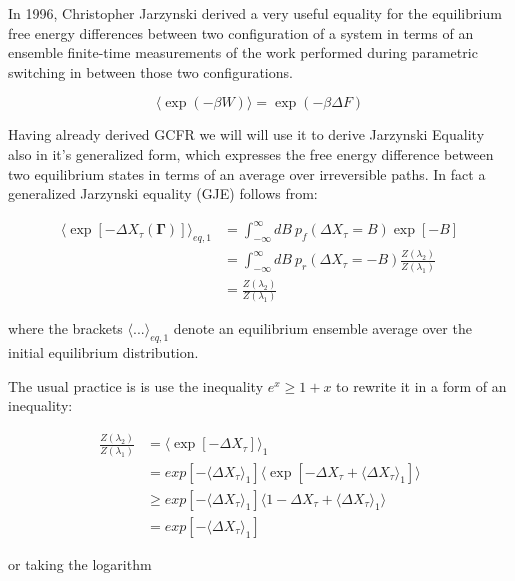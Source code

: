 \documentclass[a4paper,12pt]{article}
\begin{document}
In 1996, Christopher Jarzynski\cite{Jarzynski:1997uj} derived a very useful equality for the equilibrium free energy differences between two configuration of a system in terms of an ensemble finite-time measurements of the work performed during parametric switching in between those two configurations.

\begin{equation}
\label{JarzynskiInequality}
  \langle \exp(-\beta W) \rangle = \exp(-\beta  \Delta F)
\end{equation}


Having already derived GCFR we will will use it to derive Jarzynski Equality also in it's generalized form, which expresses the free energy difference between two equilibrium states in terms of an average over irreversible paths.
In fact a generalized Jarzynski equality (GJE) follows from:

\begin{equation}
\begin{aligned}
  \langle \exp[-\Delta X_{\tau}(\bm{\Gamma})] \rangle_{eq,1} 
  &= \int_{-\infty}^{\infty} dB\ p_f(\Delta X_\tau =B)\exp[-B]\\
 &= \int_{-\infty}^{\infty} dB\ p_r(\Delta X_\tau =-B)\frac{Z(\lambda_2)}{Z(\lambda_1)}\\
 &=\frac{Z(\lambda_2)}{Z(\lambda_1)}
\end{aligned}
\end{equation}

where the brackets $\langle ... \rangle_{eq,1}$ denote an equilibrium ensemble average over the initial equilibrium distribution.

The usual practice is is use the inequality $e^x \geq 1+x $ to rewrite it in a form of an inequality:

\begin{equation}
\begin{aligned}
  \frac{Z(\lambda_2)}{Z(\lambda_1)} &=\langle \exp[-\Delta X_\tau ]\rangle_1 \\
  &=exp[-\langle\Delta X_\tau \rangle_1]\langle \exp[-\Delta X_\tau + \langle \Delta X_\tau \rangle_1]\rangle \\
  &\geq exp[-\langle\Delta X_\tau \rangle_1]\langle 1- \Delta X_\tau + \langle \Delta X_\tau \rangle_1 \rangle \\
  &=exp[-\langle\Delta X_\tau \rangle_1]
\end{aligned}
\end{equation}

or taking the logarithm
\end{document}
